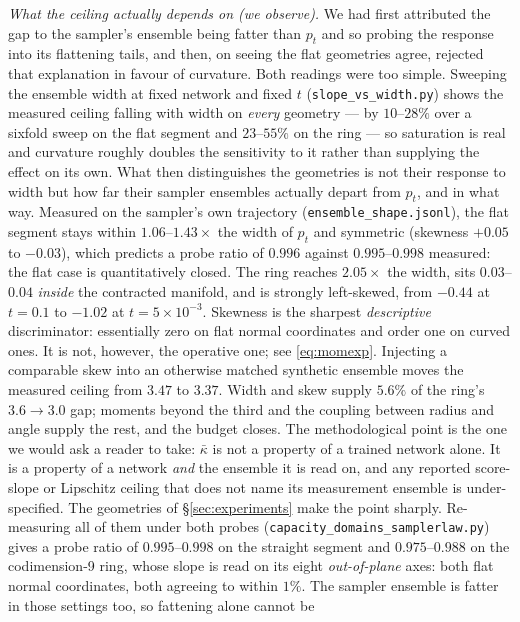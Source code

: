 \documentclass[11pt]{article}
\theoremstyle{remark}
\newcommand{\kb}{\bar\kappa}
\begin{document}
\emph{What the ceiling actually depends on (\emph{we observe}).} We had first attributed
the gap to the sampler's ensemble being fatter than $p_t$ and so probing the response into
its flattening tails, and then, on seeing the flat geometries agree, rejected that
explanation in favour of curvature. Both readings were too simple. Sweeping the ensemble
width at fixed network and fixed $t$ (\texttt{slope\_vs\_width.py}) shows the measured
ceiling falling with width on \emph{every} geometry --- by $10$--$28\%$ over a sixfold
sweep on the flat segment and $23$--$55\%$ on the ring --- so saturation is real and
curvature roughly doubles the sensitivity to it rather than supplying the effect on its own.
What then distinguishes the geometries is not their response to width but how far their
sampler ensembles actually depart from $p_t$, and in what way. Measured on the sampler's
own trajectory (\texttt{ensemble\_shape.jsonl}), the flat segment stays within
$1.06$--$1.43\times$ the width of $p_t$ and symmetric (skewness $+0.05$ to $-0.03$),
which predicts a probe ratio of $0.996$ against $0.995$--$0.998$ measured: the flat case
is quantitatively closed. The ring reaches $2.05\times$ the width, sits $0.03$--$0.04$
\emph{inside} the contracted manifold, and is strongly left-skewed, from $-0.44$ at
$t=0.1$ to $-1.02$ at $t=5\times10^{-3}$. Skewness is the sharpest \emph{descriptive} discriminator: essentially zero on flat normal
coordinates and order one on curved ones. It is not, however, the operative one; see
\eqref{eq:momexp}. Injecting
a comparable skew into an otherwise matched synthetic ensemble moves the measured ceiling
from $3.47$ to $3.37$. Width and skew supply $5.6\%$ of the ring's $3.6\to3.0$ gap; moments
beyond the third and the coupling between radius and angle supply the rest, and the budget
closes. The methodological point is the one we would ask a reader to take: $\kb$ is not a
property of a trained network alone. It is a property of a network \emph{and} the ensemble
it is read on, and any reported score-slope or Lipschitz ceiling that does not name its
measurement ensemble is under-specified. The geometries of \S\ref{sec:experiments} make
the point sharply.
Re-measuring all of them under both probes
(\texttt{capacity\_domains\_samplerlaw.py}) gives a probe ratio of $0.995$--$0.998$ on the
straight segment and $0.975$--$0.988$ on the codimension-9 ring, whose slope is read on
its eight \emph{out-of-plane} axes: both flat normal coordinates, both agreeing to within
$1\%$. The sampler ensemble is fatter in those settings too, so fattening alone cannot be
\end{document}
